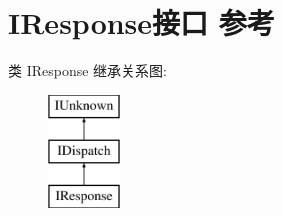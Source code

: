 \hypertarget{interface_i_response}{}\section{I\+Response接口 参考}
\label{interface_i_response}
类 I\+Response 继承关系图\+:\begin{figure}[H]
\begin{center}
\leavevmode
\includegraphics[height=3.000000cm]{interface_i_response}
\end{center}
\end{figure}
